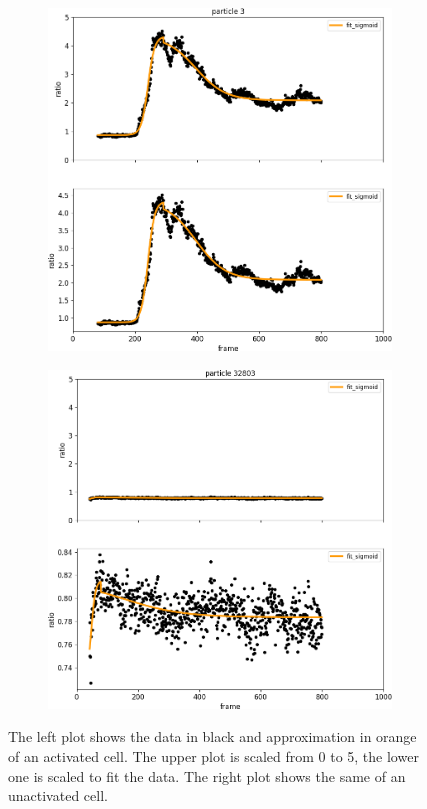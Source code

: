 \begin{figure}[h]
	\centering
	\begin{subfigure}{0.48\linewidth}
		\includegraphics[width=\textwidth]{fig/particle_vis_sigmoid_approx_pos}
	\end{subfigure}
	\hfill
	\begin{subfigure}{0.48\linewidth}
		\includegraphics[width=\textwidth]{fig/particle_vis_sigmoid_approx_neg}
	\end{subfigure}
	
	\caption{The left plot shows the data in black and approximation in orange of an activated cell. The upper plot is scaled from 0 to 5, the lower one is scaled to fit the data. The right plot shows the same of an unactivated cell.}
	\label{fig:particle_vis_sigmoid_approx}
\end{figure}

